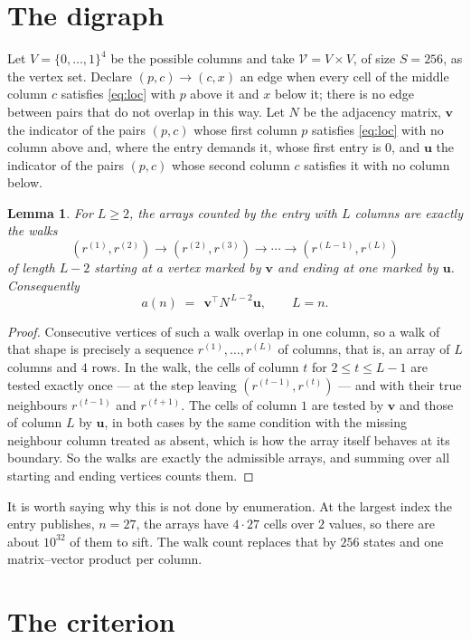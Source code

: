 \documentclass[11pt,a4paper]{article}
\theoremstyle{plain}
\newtheorem{lemma}[theorem]{Lemma}
\theoremstyle{definition}
\begin{document}
\section{The digraph}

Let $V=\{0,\dots,1\}^{4}$ be the possible columns and take
$\mathcal V=V\times V$, of size $S=256$, as the vertex set. Declare $(p,c)\to(c,x)$ an edge
when every cell of the middle column $c$ satisfies \eqref{eq:loc} with $p$ above it and $x$
below it; there is no edge between pairs that do not overlap in this way. Let $N$ be the
adjacency matrix, $\mathbf{v}$ the indicator of the pairs $(p,c)$ whose first column $p$
satisfies \eqref{eq:loc} with no column above and, where the entry demands it, whose first entry is $0$, and $\mathbf{u}$ the indicator of
the pairs $(p,c)$ whose second column $c$ satisfies it with no column below.

\begin{lemma}\label{lem:walk}
For $L\ge2$, the arrays counted by the entry with $L$ columns are exactly the walks
\[
(r^{(1)},r^{(2)})\to(r^{(2)},r^{(3)})\to\cdots\to(r^{(L-1)},r^{(L)})
\]
of length $L-2$ starting at a vertex marked by $\mathbf{v}$ and ending at one marked by
$\mathbf{u}$. Consequently
\[
a(n)\;=\;\,\mathbf{v}^{\!\top}N^{\,L-2}\mathbf{u},\qquad L=n .
\]
\end{lemma}

\begin{proof}
Consecutive vertices of such a walk overlap in one column, so a walk of that shape is
precisely a sequence $r^{(1)},\dots,r^{(L)}$ of columns, that is, an array of $L$ columns
and $4$ rows. In the walk, the cells of column $t$ for $2\le t\le L-1$ are tested
exactly once --- at the step leaving $(r^{(t-1)},r^{(t)})$ --- and with their true
neighbours $r^{(t-1)}$ and $r^{(t+1)}$. The cells of column $1$ are tested by
$\mathbf{v}$ and those of column $L$ by $\mathbf{u}$, in both cases by the same condition
with the missing neighbour column treated as absent, which is how the array itself behaves at
its boundary. So the walks are exactly the admissible arrays, and summing over all starting
and ending vertices counts them.
\end{proof}


It is worth saying why this is not done by enumeration. At the largest index the entry
publishes, $n=27$, the arrays have $4\cdot27$ cells over
$2$ values, so there are about $10^{32}$ of them to sift. The
walk count replaces that by $256$ states and one matrix--vector product per column.
\section{The criterion}
\end{document}
